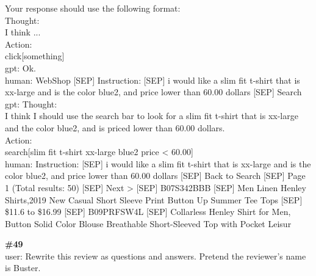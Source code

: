 \documentclass[10pt]{article}
\begin{document}
\begin{Form}
\begin{tcolorbox}[colback=convbg,colframe=itemframe,boxrule=0.8pt,arc=2pt,breakable,left=6pt,right=6pt,top=5pt,bottom=5pt]
{Your response should use the following format: \\[2pt]
Thought: \\[2pt]
I think ... \\[2pt]
Action: \\[2pt]
click[something] \\[2pt]
gpt: Ok. \\[2pt]
human: WebShop [SEP] Instruction: [SEP] i would like a slim fit t-shirt that is xx-large and is the color blue2, and price lower than 60.00 dollars [SEP] Search \\[2pt]
gpt: Thought: \\[2pt]
I think I should use the search bar to look for a slim fit t-shirt that is xx-large and the color blue2, and is priced lower than 60.00 dollars. \\[2pt]
Action: \\[2pt]
search[slim fit t-shirt xx-large blue2 price < 60.00] \\[2pt]
human: Instruction: [SEP] i would like a slim fit t-shirt that is xx-large and is the color blue2, and price lower than 60.00 dollars [SEP] Back to Search [SEP] Page 1 (Total results: 50) [SEP] Next > [SEP] B07S342BBB [SEP] Men Linen Henley Shirts,2019 New Casual Short Sleeve Print Button Up Summer Tee Tops [SEP] \$11.6 to \$16.99 [SEP] B09PRFSW4L [SEP] Collarless Henley Shirt for Men, Button Solid Color Blouse Breathable Short-Sleeved Top with Pocket Leisur}
\end{tcolorbox}
\vspace{-1pt}
\CheckBox[name=q48c,width=1.6ex,height=1.6ex,bordercolor={0.45 0.45 0.45}]{~\textcolor{cbox}{COMPACT}}\quad
\CheckBox[name=q48d,width=1.6ex,height=1.6ex,bordercolor={0.45 0.45 0.45}]{~\textcolor{dbox}{DIFFUSE}}\quad
\CheckBox[name=q48n,width=1.6ex,height=1.6ex,bordercolor={0.45 0.45 0.45}]{~\textcolor{nbox}{NONE}}
\vspace{8pt}
\begin{tcolorbox}[colback=convbg,colframe=itemframe,boxrule=0.8pt,arc=2pt,breakable,left=6pt,right=6pt,top=5pt,bottom=5pt]
{\footnotesize\textbf{\#49}}\\[3pt]
{\footnotesize user: Rewrite this review as questions and answers. Pretend the reviewer's name is Buster. \\[2pt]
}
\end{tcolorbox}
\end{Form}
\end{document}
